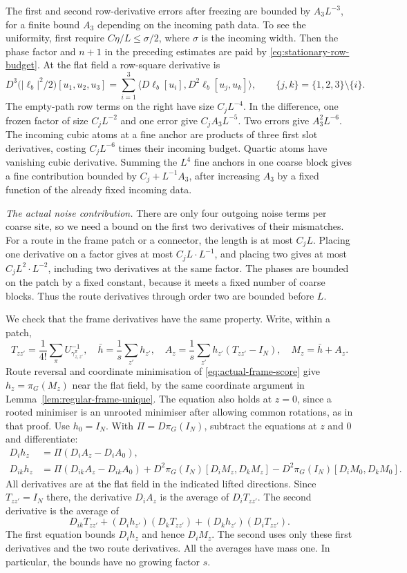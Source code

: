 \documentclass[11pt,reqno]{amsart}
\numberwithin{equation}{section}
\theoremstyle{definition}
\theoremstyle{remark}
\begin{document}
The first and second row-derivative errors after freezing
are bounded by \(A_3L^{-3}\), for a finite bound \(A_3\)
depending on the incoming path data. To see the uniformity,
first require \(C\eta/L\le\sigma/2\), where \(\sigma\)
is the incoming width. Then the phase factor and
\(n+1\) in the preceding estimates are paid by
\eqref{eq:stationary-row-budget}. At the flat field a
row-square derivative is
\[
 D^3\bigl(|\ell_b|^2/2\bigr)[u_1,u_2,u_3]
     =\sum_{i=1}^3
       \big\langle D\ell_b[u_i],D^2\ell_b[u_j,u_k]\big\rangle,
 \qquad \{j,k\}=\{1,2,3\}\setminus\{i\}.
\]
The empty-path row terms on the right have size \(C_jL^{-4}\).
In the difference, one frozen factor of size \(C_jL^{-2}\)
and one error give \(C_jA_3L^{-5}\). Two errors give
\(A_3^2L^{-6}\). The incoming cubic atoms at a fine anchor
are products of three first slot derivatives, costing
\(C_jL^{-6}\) times their incoming budget. Quartic atoms
have vanishing cubic derivative. Summing the \(L^4\)
fine anchors in one coarse block gives a fine contribution
bounded by \(C_j+L^{-1}A_3\), after increasing \(A_3\)
by a fixed function of the already fixed incoming data.

\smallskip\noindent
\emph{The actual noise contribution.}
There are only four outgoing noise terms per coarse site,
so we need a bound on the first two derivatives of their
mismatches. For a route in the frame patch or a connector,
the length is at most \(C_jL\). Placing one derivative on
a factor gives at most \(C_jL\cdot L^{-1}\), and placing
two gives at most \(C_jL^2\cdot L^{-2}\), including two
derivatives at the same factor. The phases are bounded
on the patch by a fixed constant, because it meets a
fixed number of coarse blocks. Thus the route derivatives
through order two are bounded before \(L\).

We check that the frame derivatives have the same
property. Write, within a patch,
\[
 T_{zz'}=\frac1{4!}\sum_\pi U_{\gamma_{z,z'}^\pi}^{-1},
 \quad
 \bar h=\frac1s\sum_{z'}h_{z'},\quad
 A_z=\frac1s\sum_{z'}h_{z'}(T_{zz'}-I_N),
 \quad M_z=\bar h+A_z .
\]
Route reversal and coordinate minimisation of
\eqref{eq:actual-frame-score} give \(h_z=\pi_G(M_z)\)
near the flat field, by the same coordinate argument in
Lemma~\ref{lem:regular-frame-unique}. The equation also
holds at \(z=0\), since a rooted minimiser is an unrooted
minimiser after allowing common rotations, as in that proof.
Use \(h_0=I_N\). With \(\Pi=D\pi_G(I_N)\), subtract the
equations at \(z\) and \(0\) and differentiate:
\begin{align*}
 D_i h_z &=\Pi(D_i A_z-D_i A_0),\\
 D_{ik}h_z
   &=\Pi(D_{ik}A_z-D_{ik}A_0)
       +D^2\pi_G(I_N)[D_iM_z,D_kM_z]
       -D^2\pi_G(I_N)[D_iM_0,D_kM_0].
\end{align*}
All derivatives are at the flat field in the indicated
lifted directions. Since \(T_{zz'}=I_N\) there, the
derivative \(D_i A_z\) is the average of \(D_i T_{zz'}\).
The second derivative is the average of
\[
 D_{ik}T_{zz'}+(D_i h_{z'})(D_k T_{zz'})
                       +(D_k h_{z'})(D_i T_{zz'}).
\]
The first equation bounds \(D_i h_z\) and hence
\(D_iM_z\). The second uses only these first derivatives
and the two route derivatives. All the averages have
mass one. In particular, the bounds have no growing
factor \(s\).
\end{document}
